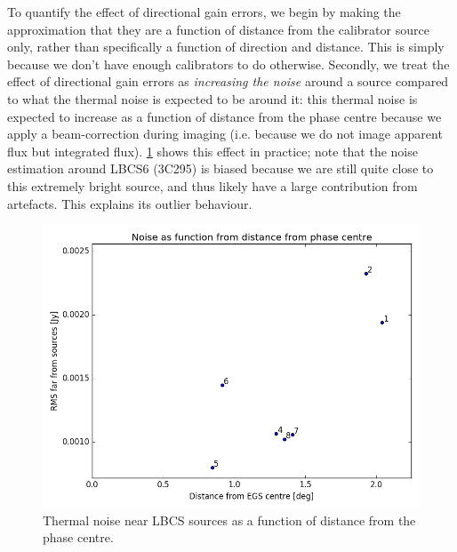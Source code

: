 \pg
To quantify the effect of directional gain errors, we begin by making the approximation that they are a function of distance from the calibrator source only, rather than specifically a function of direction and distance. This is simply because we don't have enough calibrators to do otherwise. Secondly, we treat the effect of directional gain errors as \textit{increasing the noise} around a source compared to what the thermal noise is expected to be around it: this thermal noise is expected to increase as a function of distance from the phase centre because we apply a beam-correction during imaging (i.e. because we do not image apparent flux but integrated flux). \cref{fig.noiserms.distEGS} shows this effect in practice; note that the noise estimation around LBCS6 (3C295) is biased because we are still quite close to this extremely bright source, and thus likely have a large contribution from artefacts. This explains its outlier behaviour.
\begin{figure}[h!]
\includegraphics[width=0.8\linewidth]{images/RMSvsDistFromEGS.png}
\caption{Thermal noise near LBCS sources as a function of distance from the phase centre.}
\label{fig.noiserms.distEGS}
\end{figure}

